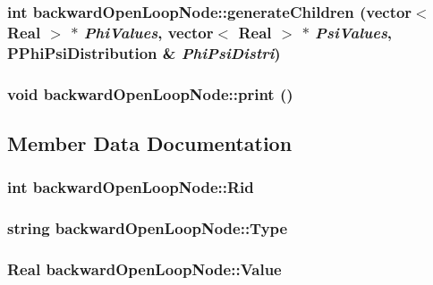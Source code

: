 \subsubsection{\setlength{\rightskip}{0pt plus 5cm}int backward\-Open\-Loop\-Node::generate\-Children (vector$<$ Real $>$ $\ast$ {\em Phi\-Values}, vector$<$ Real $>$ $\ast$ {\em Psi\-Values}, {\bf PPhi\-Psi\-Distribution} \& {\em Phi\-Psi\-Distri})\hspace{0.3cm}{\tt  [inline]}}\label{classbackwardOpenLoopNode_d76668215977e9d383d051b256224ac3}


\subsubsection{\setlength{\rightskip}{0pt plus 5cm}void backward\-Open\-Loop\-Node::print ()\hspace{0.3cm}{\tt  [inline]}}\label{classbackwardOpenLoopNode_9a376a848ee68e202d45ce95aa67472d}




\subsection{Member Data Documentation}
\subsubsection{\setlength{\rightskip}{0pt plus 5cm}int {\bf backward\-Open\-Loop\-Node::Rid}}\label{classbackwardOpenLoopNode_2ee00a25c13faaba5fe91b24aebde3c9}


\subsubsection{\setlength{\rightskip}{0pt plus 5cm}string {\bf backward\-Open\-Loop\-Node::Type}}\label{classbackwardOpenLoopNode_4e6aa9323467038fa8959e9d368c96d7}


\subsubsection{\setlength{\rightskip}{0pt plus 5cm}Real {\bf backward\-Open\-Loop\-Node::Value}}\label{classbackwardOpenLoopNode_b6909a06ed7abc409f0f462a57be85ac}


